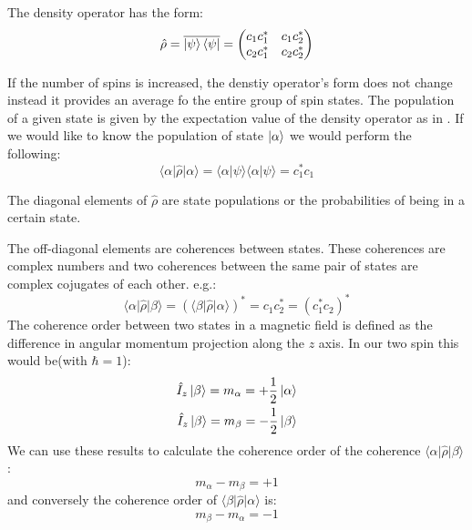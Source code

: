 The density operator has the form:
\begin{equation}
  \hat\rho = \overline{\ket{\psi}\bra{\psi}} = \begin{pmatrix}
    c_1c_1^* & c_1c_2^*\\
    c_2c_1^* & c_2c_2^*
\end{pmatrix}
\end{equation}

If the number of spins is increased, the denstiy operator's form does not change instead it provides
an average fo the entire group of spin states. The population of a given state is given by the expectation value of the density operator as in . If we would like to know
the population of state $\ket{\alpha}$ we would perform the following:
\begin{equation}
  \langle\alpha\vert\hat\rho\vert\alpha\rangle = \langle\alpha\vert\psi\rangle \langle\alpha\vert\psi\rangle = c_1^*c_1
\end{equation}

The diagonal elements of $\hat\rho$ are state populations or the probabilities of being in a certain state.

The off-diagonal elements are coherences between states. These coherences are complex numbers and two coherences between the same pair of states are complex cojugates of each other. e.g.:
\begin{equation}
  \langle\alpha\vert\hat\rho\vert\beta\rangle = (\langle\beta\vert\hat\rho\vert\alpha\rangle)^* = c_1c_2^* = (c_1^*c_2)^*
\end{equation}
The coherence order between two states in a magnetic field is defined as the difference in angular
momentum projection along the $z$ axis. In our two spin this would be(with $\hbar = 1$):
\begin{align}
  \hat{I}_z\ket{\beta} = m_\alpha = +\frac{1}{2}\ket{\alpha}\\
  \hat{I}_z\ket{\beta} = m_\beta = -\frac{1}{2}\ket{\beta}
\end{align}
We can use these results to calculate the coherence order of the coherence $\langle\alpha\vert\hat\rho\vert\beta\rangle$:
\begin{equation}
 m_\alpha - m_\beta = +1
\end{equation}
and conversely the coherence order of $\langle\beta\vert\hat\rho\vert\alpha\rangle$ is:
\begin{equation}
  m_\beta - m_\alpha = -1
\end{equation}

